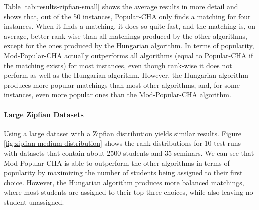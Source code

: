 \begin{table}[h!]
  \centering
  \caption{Average results for the small Zipfian dataset with 50 runs}
  \label{tab:results-zipfian-small}
\end{table}

Table \ref{tab:results-zipfian-small} shows the average results in more detail and shows that, out of the 50 instances, Popular-CHA only finds a matching for four instances. When it finds a matching, it does so quite fast, and the matching is, on average, better rank-wise than all matchings produced by the other algorithms, except for the ones produced by the Hungarian algorithm. In terms of popularity, Mod-Popular-CHA actually outperforms all algorithms (equal to Popular-CHA if the matching exists) for most instances, even though rank-wise it does not perform as well as the Hungarian algorithm. However, the Hungarian algorithm produces more popular matchings than most other algorithms, and, for some instances, even more popular ones than the Mod-Popular-CHA algorithm.

\paragraph{Large Zipfian Datasets}
Using a large dataset with a Zipfian distribution yields similar results. Figure \ref{fig:zipfian-medium-distribution} shows the rank distributions for 10 test runs with datasets that contain about 2500 students and 35 seminars. We can see that Mod Popular-CHA is able to outperform the other algorithms in terms of popularity by maximizing the number of students being assigned to their first choice. However, the Hungarian algorithm produces more balanced matchings, where most students are assigned to their top three choices, while also leaving no student unassigned.

